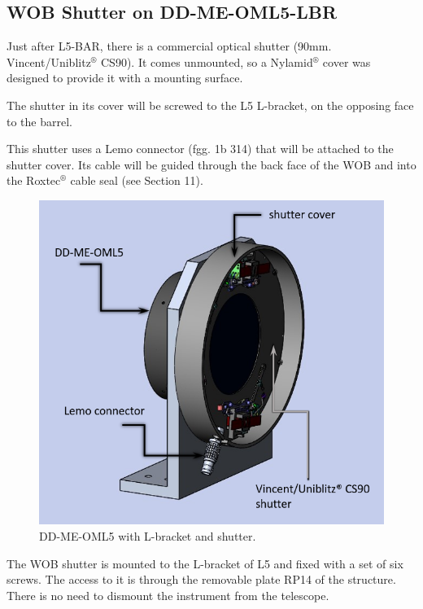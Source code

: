 \documentclass{report}
\begin{document}
\subsection{WOB Shutter on DD-ME-OML5-LBR}

Just after L5-BAR, there is a commercial optical shutter (90mm. Vincent/Uniblitz${}^\circledR$ CS90). It comes unmounted, so a Nylamid${}^\circledR$ cover was designed to provide it with a mounting surface.

The shutter in its cover will be screwed to the L5 L-bracket, on the opposing face to the barrel.

This shutter uses a Lemo connector (fgg. 1b 314) that will be attached to the shutter cover. Its cable will be guided through the back face of the WOB and into the Roxtec${}^\circledR$ cable seal (see Section 11). 

\begin{figure}
\begin{center}
\includegraphics[width=0.7\linewidth]{figures/DD-ME-OML5-SH.png}
\end{center}
\caption{DD-ME-OML5 with L-bracket and shutter.}
\label{figure:WOB-L5-SH}
\end{figure}

The WOB shutter is mounted to the L-bracket of L5 and fixed with a set of six screws. The access to it is through the removable plate RP14 of the structure. There is no need to dismount the instrument from the telescope. 
\end{document}
